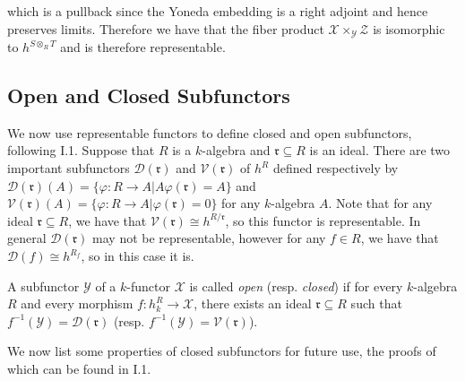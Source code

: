 \documentclass[oneside,11pt]{amsart}
\newcommand{\mX}{\ensuremath{\mathcal{X}}}
\newcommand{\mY}{\ensuremath{\mathcal{Y}}}
\newcommand{\mZ}{\ensuremath{\mathcal{Z}}}
\newcommand{\mD}{\ensuremath{\mathcal{D}}}
\newcommand{\mV}{\ensuremath{\mathcal{V}}}
\newcommand{\fr}{\ensuremath{\mathfrak{r}}}
\theoremstyle{definition}
\newtheorem{proof techniques}{Proof Techniques}
\begin{document}
\begin{center}
\end{center}

which is a pullback since the Yoneda embedding is a right adjoint and hence preserves limits. Therefore we have that the fiber product $\mX \times_{\mY} \mZ$ is isomorphic to $h^{S \otimes_R T}$ and is therefore representable. 


\subsection{Open and Closed Subfunctors}


We now use representable functors to define closed and open subfunctors, following \cite{jantzen2003}  I.1. Suppose that $R$ is a $k$-algebra and $\fr \subseteq R$ is an ideal. There are two important subfunctors $\mD(\fr)$ and $\mV(\fr)$ of $h^R$ defined respectively by $\mD(\fr)(A) = \{ \varphi : R \to A | A \varphi(\fr) = A \}$ and $\mV(\fr)(A) = \{ \varphi : R \to A | \varphi(\fr) = 0 \}$ for any $k$-algebra $A$. Note that for any ideal $\fr \subseteq R$, we have that $\mV(\fr) \cong h^{R / \fr}$, so this functor is representable. In general $\mD(\fr)$ may not be representable, however for any $f \in R$, we have that $\mD(f) \cong h^{R_f}$, so in this case it is. 

A subfunctor $\mY$ of a $k$-functor $\mX$ is called \emph{open} (resp. \emph{closed}) if for every $k$-algebra $R$ and every morphism $f: h^R_k \to \mX$, there exists an ideal $\fr \subseteq R$ such that $f^{-1}(\mY) = \mD(\fr)$ (resp. $f^{-1}(\mY) = \mV(\fr)$).


We now list some properties of closed subfunctors for future use, the proofs of which can be found in \cite{jantzen2003} I.1. 
\end{document}
